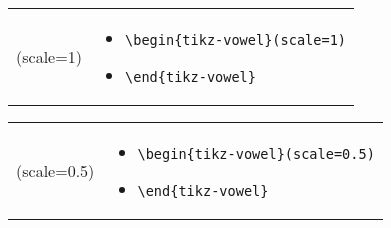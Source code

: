 \documentclass{article}
\begin{document}
\begin{center}
\begin{tabular}{rl}
  \begin{minipage}[t]{0.45\textwidth}
  \centering
	\begin{tikz-vowel}(scale=1)
	\end{tikz-vowel}
  \end{minipage} &
  \begin{minipage}[t]{0.2\textwidth}
  \vspace{-65pt}
  {\small
\begin{itemize}[label={}]
	\item \verb|\begin{tikz-vowel}(scale=1)|
	\item \verb|\end{tikz-vowel}|
\end{itemize}
    }
  \end{minipage}\\
\end{tabular}
\end{center}

\begin{center}
\begin{tabular}{rl}
  \begin{minipage}[t]{0.45\textwidth}
  \centering
	\begin{tikz-vowel}(scale=0.5)
	\end{tikz-vowel}
  \end{minipage} &
  \begin{minipage}[t]{0.2\textwidth}
  \vspace{-45pt}
  {\small
\begin{itemize}[label={}]
	\item \verb|\begin{tikz-vowel}(scale=0.5)|
	\item \verb|\end{tikz-vowel}|
\end{itemize}
    }
  \end{minipage}\\
\end{tabular}
\end{center}
\end{document}
